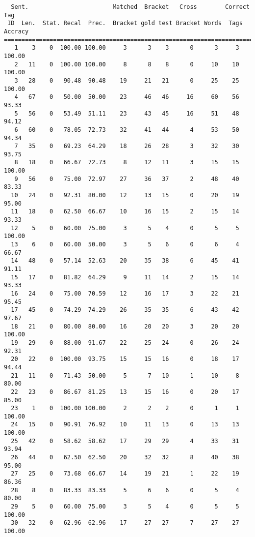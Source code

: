 \scriptsize
\begin{verbatim}
  Sent.                        Matched  Bracket   Cross        Correct Tag
 ID  Len.  Stat. Recal  Prec.  Bracket gold test Bracket Words  Tags Accracy
============================================================================
   1    3    0  100.00 100.00     3      3    3      0      3     3   100.00
   2   11    0  100.00 100.00     8      8    8      0     10    10   100.00
   3   28    0   90.48  90.48    19     21   21      0     25    25   100.00
   4   67    0   50.00  50.00    23     46   46     16     60    56    93.33
   5   56    0   53.49  51.11    23     43   45     16     51    48    94.12
   6   60    0   78.05  72.73    32     41   44      4     53    50    94.34
   7   35    0   69.23  64.29    18     26   28      3     32    30    93.75
   8   18    0   66.67  72.73     8     12   11      3     15    15   100.00
   9   56    0   75.00  72.97    27     36   37      2     48    40    83.33
  10   24    0   92.31  80.00    12     13   15      0     20    19    95.00
  11   18    0   62.50  66.67    10     16   15      2     15    14    93.33
  12    5    0   60.00  75.00     3      5    4      0      5     5   100.00
  13    6    0   60.00  50.00     3      5    6      0      6     4    66.67
  14   48    0   57.14  52.63    20     35   38      6     45    41    91.11
  15   17    0   81.82  64.29     9     11   14      2     15    14    93.33
  16   24    0   75.00  70.59    12     16   17      3     22    21    95.45
  17   45    0   74.29  74.29    26     35   35      6     43    42    97.67
  18   21    0   80.00  80.00    16     20   20      3     20    20   100.00
  19   29    0   88.00  91.67    22     25   24      0     26    24    92.31
  20   22    0  100.00  93.75    15     15   16      0     18    17    94.44
  21   11    0   71.43  50.00     5      7   10      1     10     8    80.00
  22   23    0   86.67  81.25    13     15   16      0     20    17    85.00
  23    1    0  100.00 100.00     2      2    2      0      1     1   100.00
  24   15    0   90.91  76.92    10     11   13      0     13    13   100.00
  25   42    0   58.62  58.62    17     29   29      4     33    31    93.94
  26   44    0   62.50  62.50    20     32   32      8     40    38    95.00
  27   25    0   73.68  66.67    14     19   21      1     22    19    86.36
  28    8    0   83.33  83.33     5      6    6      0      5     4    80.00
  29    5    0   60.00  75.00     3      5    4      0      5     5   100.00
  30   32    0   62.96  62.96    17     27   27      7     27    27   100.00

\end{verbatim}
